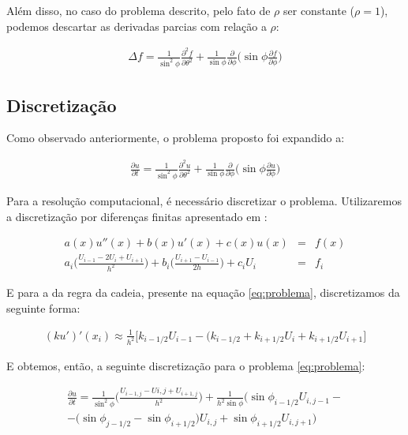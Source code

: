 \documentclass{article}
\newcommand{\partials}[2]{
	\frac{\partial #1}{\partial #2}
}
\begin{document}
			 Além disso, no caso do problema descrito, pelo fato de $\rho$ ser constante ($\rho = 1$), podemos descartar as derivadas parcias com relação a $\rho$:

			\begin{eqnarray}
			 	\Delta f = \frac{1}{\sin^2\phi}\partials{^2f}{\theta^2} + \frac{1}{\sin\phi}\partials{}{\phi}\bigg(\sin\phi \partials{f}{\phi}\bigg)
			 \end{eqnarray} 

		\subsection{Discretização}
			Como observado anteriormente, o problema proposto foi expandido a:

			\begin{eqnarray}
				\label{eq:problema}
				\frac{\partial u}{\partial t} =\frac{1}{\sin^2\phi}\partials{^2u}{\theta^2} + \frac{1}{\sin\phi}\partials{}{\phi}\bigg(\sin\phi \partials{u}{\phi}\bigg)
			\end{eqnarray}

			Para a resolução computacional, é necessário discretizar o problema. Utilizaremos a discretização por diferenças finitas apresentado em \cite{leveque2007finite}:

			\begin{eqnarray}
				a(x)u''(x) + b(x)u'(x) + c(x)u(x) &=& f(x)\\
				a_i\bigg(\frac{U_{i-1} - 2U_{i} + U_{i+1}}{h^2} \bigg) + b_i\bigg(\frac{U_{i+1} - U_{i-1}}{2h}\bigg) + c_iU_i &=& f_i
			\end{eqnarray}

			E para a da regra da cadeia, presente na equação \ref{eq:problema}, discretizamos da seguinte forma:

			\begin{eqnarray}
				(ku')'(x_i) \approx \frac{1}{h^2}\bigg[k_{i-1/2}U_{i-1} - (k_{i-1/2}+k_{i+1/2}U_i + k_{i+1/2}U_{i+1}\bigg]
			\end{eqnarray}

			E obtemos, então, a seguinte discretização para o problema \ref{eq:problema}:

			\begin{multline}
				\partials{u}{t} = \frac{1}{\sin^2\phi}\bigg(\frac{U_{i-1,j}-U{i,j} + U_{i+1,j}}{h^2}\bigg) + \frac{1}{h^2\sin\phi}\bigg(\sin\phi_{i-1/2}U_{i,j-1} - \\ - \bigg(\sin\phi_{j-1/2}-\sin\phi_{i+1/2}\bigg)U_{i,j} + \sin\phi_{i+1/2}U_{i,j+1}\bigg)
			\end{multline}
\end{document}
